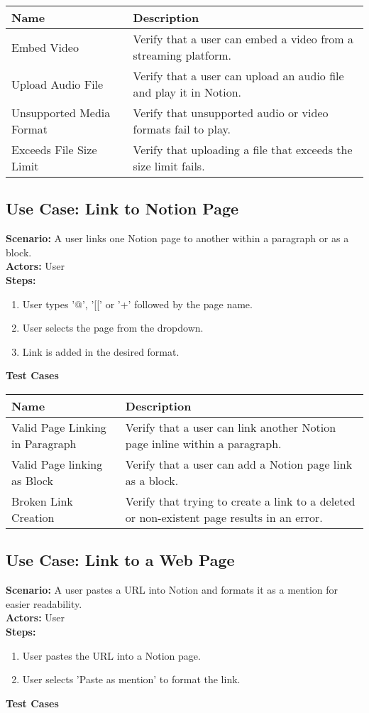\documentclass{article}
\begin{document}
            \begin{longtable}{|p{}|p{}|}
            \hline
            \textbf{Name} & \textbf{Description} \\
            \hline
            Embed Video & Verify that a user can embed a video from a streaming platform. \\
\hline
Upload Audio File & Verify that a user can upload an audio file and play it in Notion. \\
\hline
Unsupported Media Format & Verify that unsupported audio or video formats fail to play. \\
\hline
Exceeds File Size Limit & Verify that uploading a file that exceeds the size limit fails. \\
\hline
\end{longtable}\subsection{\textbf{Use Case: Link to Notion Page}}
\textbf{Scenario:} A user links one Notion page to another within a paragraph or as a block.\\
\textbf{Actors:} User\\
\textbf{Steps:}
\begin{enumerate}
\item User types '@', '[[' or '+' followed by the page name.
\item User selects the page from the dropdown.
\item Link is added in the desired format.
\end{enumerate}
\textbf{Test Cases}

            \begin{longtable}{|p{}|p{}|}
            \hline
            \textbf{Name} & \textbf{Description} \\
            \hline
            Valid Page Linking in Paragraph & Verify that a user can link another Notion page inline within a paragraph. \\
\hline
Valid Page linking as Block & Verify that a user can add a Notion page link as a block. \\
\hline
Broken Link Creation & Verify that trying to create a link to a deleted or non-existent page results in an error. \\
\hline
\end{longtable}\subsection{\textbf{Use Case: Link to a Web Page}}
\textbf{Scenario:} A user pastes a URL into Notion and formats it as a mention for easier readability.\\
\textbf{Actors:} User\\
\textbf{Steps:}
\begin{enumerate}
\item User pastes the URL into a Notion page.
\item User selects 'Paste as mention' to format the link.
\end{enumerate}
\textbf{Test Cases}
\end{document}
